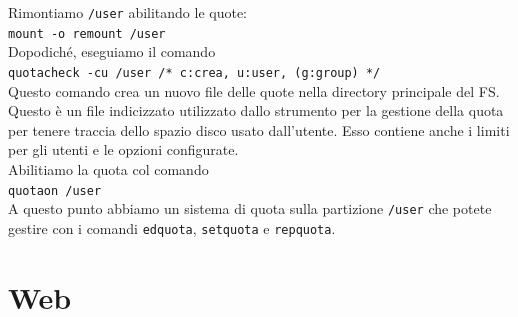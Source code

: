 \documentclass[a4paper]{report}
\newcommand\tab[1][1cm]{\hspace*{#1}}
\begin{document}
Rimontiamo \texttt{/user} abilitando le quote:\\
\tab\texttt{mount -o remount /user}\\
Dopodiché, eseguiamo il comando\\
\tab\texttt{quotacheck -cu /user /* c:crea, u:user, (g:group) */}\\
Questo comando crea un nuovo file delle quote nella directory principale del FS. Questo è un file indicizzato utilizzato dallo strumento per la gestione della quota per tenere traccia dello spazio disco usato dall'utente. Esso contiene anche i limiti per gli utenti e le opzioni configurate.\\
Abilitiamo la quota col comando\\
\tab\texttt{quotaon /user}\\
A questo punto abbiamo un sistema di quota sulla partizione \texttt{/user} che potete gestire con i comandi \texttt{edquota}, \texttt{setquota} e \texttt{repquota}.\\
\chapter{Web}
\end{document}
